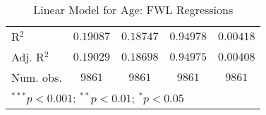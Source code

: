 \begin{table}
\begin{center}
\begin{tabular}{l c c c c}
\hline
R$^2$           & $0.19087$        & $0.18747$        & $0.94978$        & $0.00418$        \\
Adj. R$^2$      & $0.19029$        & $0.18698$        & $0.94975$        & $0.00408$        \\
Num. obs.       & $9861$           & $9861$           & $9861$           & $9861$           \\
\hline
\multicolumn{5}{l}{\scriptsize{$^{***}p<0.001$; $^{**}p<0.01$; $^{*}p<0.05$}}
\end{tabular}
\caption{Linear Model for Age: FWL Regressions}
\label{tab:reg_age_fwl}
\end{center}
\end{table}

